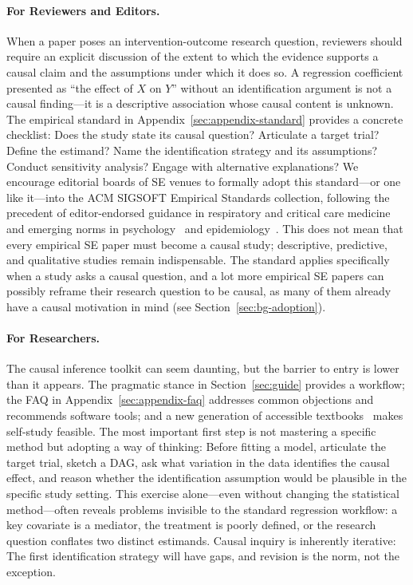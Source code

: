 \paragraph{For Reviewers and Editors.}
When a paper poses an intervention-outcome research question, reviewers should require an explicit discussion of the extent to which the evidence supports a causal claim and the assumptions under which it does so.
A regression coefficient presented as ``the effect of $X$ on $Y$'' without an identification argument is not a causal finding---it is a descriptive association whose causal content is unknown.
The empirical standard in Appendix~\ref{sec:appendix-standard} provides a concrete checklist: Does the study state its causal question? Articulate a target trial? Define the estimand? Name the identification strategy and its assumptions? Conduct sensitivity analysis? Engage with alternative explanations?
We encourage editorial boards of SE venues to formally adopt this standard---or one like it---into the ACM SIGSOFT Empirical Standards collection, following the precedent of editor-endorsed guidance in respiratory and critical care medicine~\cite{lederer2019control} and emerging norms in psychology~\cite{grosz2020taboo} and epidemiology~\cite{hernan2018cword}.
This does not mean that every empirical SE paper must become a causal study; descriptive, predictive, and qualitative studies remain indispensable.
The standard applies specifically when a study asks a causal question, and a lot more empirical SE papers can possibly reframe their research question to be causal, as many of them already have a causal motivation in mind (see Section~\ref{sec:bg-adoption}).

\paragraph{For Researchers.}
The causal inference toolkit can seem daunting, but the barrier to entry is lower than it appears.
The pragmatic stance in Section~\ref{sec:guide} provides a workflow; the FAQ in Appendix~\ref{sec:appendix-faq} addresses common objections and recommends software tools; and a new generation of accessible textbooks~\cite{cunningham2021causal, huntingtonklein2021effect, hernan2020causal, angrist2009mostly} makes self-study feasible.
The most important first step is not mastering a specific method but adopting a way of thinking: Before fitting a model, articulate the target trial, sketch a DAG, ask what variation in the data identifies the causal effect, and reason whether the identification assumption would be plausible in the specific study setting.
This exercise alone---even without changing the statistical method---often reveals problems invisible to the standard regression workflow: a key covariate is a mediator, the treatment is poorly defined, or the research question conflates two distinct estimands.
Causal inquiry is inherently iterative: The first identification strategy will have gaps, and revision is the norm, not the exception.


